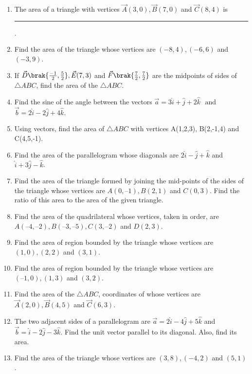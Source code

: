 \begin{enumerate}[label=\thesubsection.\arabic*,ref=\thesubsection.\theenumi]
\begin{enumerate}
\end{enumerate}
		\label{10/7/3/1}
\solution
		
\item The area of a triangle with vertices $\vec{A}(3, 0), \vec{B}(7, 0)$ and  $\vec{C}(8, 4)$ is \rule{1cm}{0.1pt}.
\item Find the area of the triangle whose vertices are $(-8,4),(-6,6)$ and $(-3,9)$.
\item If $\vec{D}\brak{\frac{-1}{2},\frac{5}{2}},\vec{E}(7,3)$ and $\vec{F}\brak{\frac{7}{2},\frac{7}{2}}$ are the midpoints of sides of $\triangle ABC$, find the area of the $\triangle ABC$.
\item Find the sine of the angle between the vectors $\vec{a}=3\hat{i}+\hat{j}+2\hat{k}$ $\text{ and }$ $\vec{b}=2\hat{i}-2\hat{j}+4\hat{k}$.
\item Using vectors, find the area of $\triangle{ABC}$ with vertices A(1,2,3), B(2,-1,4) and C(4,5,-1).
\item Find the area of the parallelogram whose diagonals are $2\hat{i}-\hat{j}+\hat{k}$ and $\hat{i}+3\hat{j}-\hat{k}$.
\item Find the area of the triangle formed by joining the mid-points of the sides of the triangle whose vertices are $A(0, –1), B(2, 1)$  and  $C(0, 3)$. Find the ratio of this area to the area of the given triangle.
	\\
\solution
		
%
\item Find the area of the quadrilateral whose vertices, taken in order, are $A(– 4, – 2), B(– 3, – 5), C(3, – 2)$  and $ D(2, 3)$.
	\\
\solution
		
\item Find the area of region bounded by the triangle whose
	vertices are $(1, 0), (2, 2)$ and $(3, 1)$. 
\item Find the area of region bounded by the triangle whose vertices
	are $(– 1, 0), (1, 3)$  and  $(3, 2)$. 
\item Find the area of the $\triangle ABC$, coordinates of whose vertices are $\vec{A}(2, 0), \vec{B}(4, 5)$ and $\vec{C}(6, 3)$.
%
\item The two adjacent sides of a parallelogram are 
$\vec{a}= 2\hat{i}-4\hat{j}+5\hat{k}$  and  $\vec{b} =\hat{i}-2\hat{j}-3\hat{k}$.
Find the unit vector parallel to its diagonal. Also, find its area.\\
	\solution
		
\item Find the area of the triangle whose vertices are $(3,8), (-4,2)$ and $(5,1)$.

\end{enumerate}
